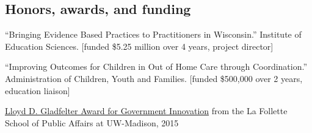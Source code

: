 \documentclass[margin,line]{res}
\newenvironment{list1}{
  \begin{list}{\ding{113}}{%
      \setlength{\itemsep}{0in}
      \setlength{\parsep}{0in} \setlength{\parskip}{0in}
      \setlength{\topsep}{0in} \setlength{\partopsep}{0in} 
      \setlength{\leftmargin}{0.17in}}}{\end{list}}
\newenvironment{list2}{
  \begin{list}{$\bullet$}{%
      \setlength{\itemsep}{0in}
      \setlength{\parsep}{0in} \setlength{\parskip}{0in}
      \setlength{\topsep}{0in} \setlength{\partopsep}{0in} 
      \setlength{\leftmargin}{0.2in}}}{\end{list}}
\begin{document}
\begin{resume}
% 
% 
% 

\vspace*{-2.0mm}
\section{\sc Honors, awards, and funding} 

``Bringing Evidence Based Practices to Practitioners in Wisconsin.''
Institute of Education Sciences. [funded \$5.25 million over 4 years, project director]

\vspace*{-2.5mm}

``Improving Outcomes for Children in Out of Home Care through Coordination.'' 
Administration of Children, Youth and Families. [funded \$500,000 over 2 years, education liaison]

\vspace*{-2.5mm}

\href{https://www.lafollette.wisc.edu/news/2015-gladfelter-winners-announced}{Lloyd D. Gladfelter Award for Government Innovation} from the La Follette School of Public Affairs at UW-Madison, 2015


\end{resume}
\end{document}
